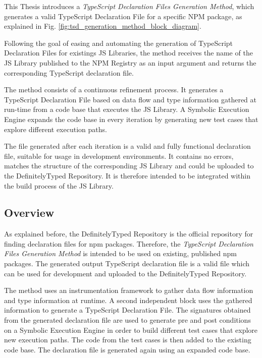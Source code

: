 This Thesis introduces a \textit{TypeScript Declaration Files Generation Method}, which generates a valid TypeScript Declaration File for a specific NPM package, as explained in Fig. \ref{fig:tsd_generation_method_block_diagram}.



Following the goal of easing and automating the generation of TypeScript Declaration Files for existings JS Libraries, the method receives the name of the JS Library published to the NPM Registry as an input argument and returns the corresponding TypeScript declaration file.

The method consists of a continuous refinement process. It generates a TypeScript Declaration File based on data flow and type information gathered at run-time from a code base that executes the JS Library. A Symbolic Execution Engine expands the code base in every iteration by generating new test cases that explore different execution paths.

The file generated after each iteration is a valid and fully functional declaration file, suitable for usage in development environments. It contains no errors, matches the structure of the corresponding JS Library and could be uploaded to the DefinitelyTyped Repository. It is therefore intended to be integrated within the build process of the JS Library.


\subsection{Overview}
As explained before, the DefinitelyTyped Repository is the official repository for finding declaration files for npm packages. Therefore, the \textit{TypeScript Declaration Files Generation Method} is intended to be used on existing, published npm packages. The generated output TypeScript declaration file is a valid file which can be used for development and uploaded to the DefinitelyTyped Repository.

The method uses an instrumentation framework to gather data flow information and type information at runtime. A second independent block uses the gathered information to generate a TypeScript Declaration File. The signatures obtained from the generated declaration file are used to generate pre and post conditions on a Symbolic Execution Engine in order to build different test cases that explore new execution paths. The code from the test cases is then added to the existing code base. The declaration file is generated again using an expanded code base.

